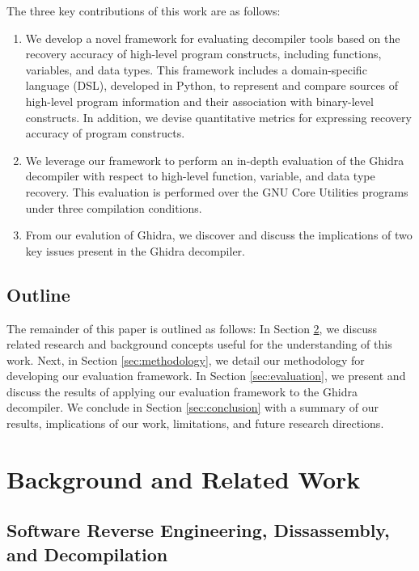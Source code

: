 The three key contributions of this work are as follows:
\begin{enumerate}
    \item We develop a novel framework for evaluating decompiler tools based on the recovery accuracy of high-level program constructs, including functions, variables, and data types. This framework includes a domain-specific language (DSL), developed in Python, to represent and compare sources of high-level program information and their association with binary-level constructs. In addition, we devise quantitative metrics for expressing recovery accuracy of program constructs.
    \item We leverage our framework to perform an in-depth evaluation of the Ghidra decompiler with respect to high-level function, variable, and data type recovery. This evaluation is performed over the GNU Core Utilities programs under three compilation conditions.
    \item From our evalution of Ghidra, we discover and discuss the implications of two key issues present in the Ghidra decompiler.
\end{enumerate}

\section{Outline}

The remainder of this paper is outlined as follows: In Section \ref{sec:background-related-work}, we discuss related research and background concepts useful for the understanding of this work. Next, in Section \ref{sec:methodology}, we detail our methodology for developing our evaluation framework. In Section \ref{sec:evaluation}, we present and discuss the results of applying our evaluation framework to the Ghidra decompiler. We conclude in Section \ref{sec:conclusion} with a summary of our results, implications of our work, limitations, and future research directions.

\chapter{Background and Related Work} \label{sec:background-related-work}

\section{Software Reverse Engineering, Dissassembly, and Decompilation}

